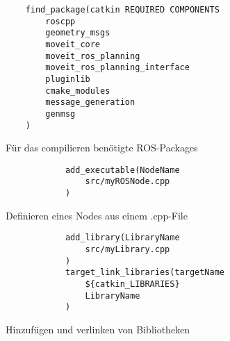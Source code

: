 \begin{minipage}[H]{\textwidth}
	\begingroup
	\parfillskip=0pt
	\begin{minipage}[t]{0.47\textwidth}        
\begin{code}
	\begin{verbatim}
	find_package(catkin REQUIRED COMPONENTS
		roscpp
		geometry_msgs
		moveit_core
		moveit_ros_planning
		moveit_ros_planning_interface
		pluginlib
		cmake_modules
		message_generation
		genmsg
	)	
	\end{verbatim}
	\vspace{-15pt}
	\caption{Für das compilieren benötigte ROS-Packages}
	\label{code:ROSPackages}
\end{code}
	\end{minipage}%
	\hfill
	\begin{minipage}[t]{0.47\textwidth}
		\begin{code}
			\begin{verbatim}
			add_executable(NodeName
				src/myROSNode.cpp
			)			
			\end{verbatim}
			\vspace{-15pt}
			\caption{Definieren eines Nodes aus einem .cpp-File}
			\label{code:CatkinCpp}
			
		\begin{code}
			\begin{verbatim}
			add_library(LibraryName
				src/myLibrary.cpp
			)			
			target_link_libraries(targetName
				${catkin_LIBRARIES}
				LibraryName
			)			
			\end{verbatim}
			\vspace{-15pt}
			\caption{Hinzufügen und verlinken von Bibliotheken}
			\label{code:catkinBib}
		\end{code}
		\end{code}  
	\end{minipage}%
	\par\endgroup
\end{minipage}

